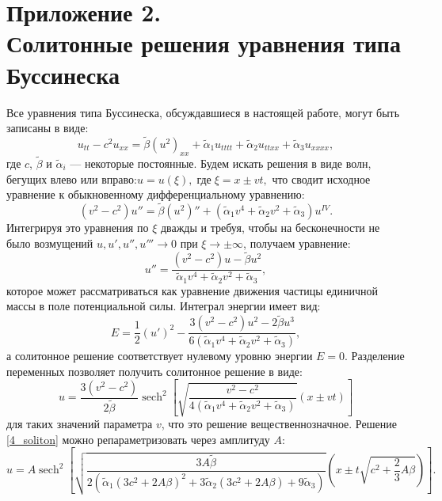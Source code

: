 \documentclass[12pt, a4paper]{report}
\DeclareMathOperator{\sech}{sech}
\newcommand{\lb}{\left (}
\newcommand{\rb}{\right )}
\begin{document}
\chapter*{\vspace{-20mm}Приложение 2.\\Солитонные решения уравнения типа Буссинеска}
Все уравнения типа Буссинеска, обсуждавшиеся в настоящей работе, могут быть записаны в виде:
\begin{equation}
u_{tt} - c^2 u_{xx} = \tilde{\beta} (u^2)_{xx} + \tilde\alpha_1 u_{tttt} + \tilde\alpha_2 u_{ttxx} + \tilde\alpha_3 u_{xxxx},
\end{equation}
где $c$, $\tilde\beta$ и $\tilde\alpha_i$ --- некоторые постоянные. Будем искать решения в виде волн, бегущих влево или вправо:$ u = u(\xi), \; \mbox{где} \; \xi = x \pm vt, $
что сводит исходное уравнение к обыкновенному дифференциальному уравнению:
\begin{equation}
(v^2 - c^2) u'' = \tilde\beta (u^2)'' + (\tilde\alpha_1 v^4 + \tilde\alpha_2 v^2 + \tilde\alpha_3) u^{IV}.
\label{ODE}
\end{equation}
Интегрируя это уравнения по $\xi$ дважды и требуя, чтобы на бесконечности не было возмущений $u, u', u'', u''' \to 0$ при $\xi \to \pm \infty$, получаем уравнение:
\begin{equation}
u'' = \frac{(v^2-c^2) u - \tilde\beta u^2}{\tilde\alpha_1 v^4 + \tilde\alpha_2 v^2 + \tilde\alpha_3},
\end{equation}
которое может рассматриваться как уравнение движения частицы единичной массы в поле потенциальной силы. Интеграл энергии имеет вид:
\begin{equation}
E = \frac 12 \left (u' \right )^2 - \frac{3 (v^2-c^2) u^2 - 2 \tilde\beta u^3}{6 (\tilde\alpha_1 v^4 + \tilde\alpha_2 v^2 + \tilde\alpha_3)},
\end{equation}
а солитонное решение соответствует нулевому уровню энергии $E=0$. Разделение переменных позволяет получить солитонное решение в виде:
\begin{equation} \label{4_soliton}
u = \frac{3 (v^2 - c^2)}{2 \tilde\beta} \sech^2 \left [\sqrt{\frac{v^2 - c^2}{4 (\tilde\alpha_1 v^4 + \tilde\alpha_2 v^2 + \tilde\alpha_3)}} (x \pm v t)\right ]
\end{equation}
для таких значений параметра $v$, что это решение вещественнозначное.
Решение \eqref{4_soliton} можно репараметризовать через амплитуду $A$:
\begin{equation}
u = A \sech^2 \left [\sqrt{\frac{3A\tilde{\beta}}{2 (\tilde\alpha_1 (3c^2+2A\beta)^2 + 3\tilde\alpha_2 (3c^2+2A\beta) + 9\tilde\alpha_3)}} \lb x \pm t\sqrt{c^2+\frac23A\beta} \rb\right ].
\end{equation}
	
\end{document}
